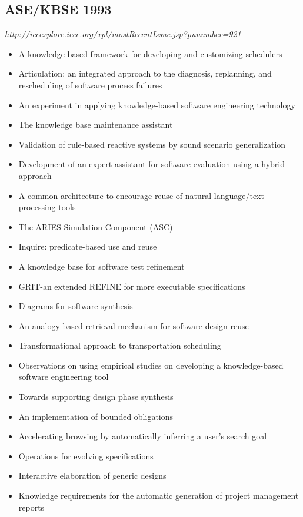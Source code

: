 \subsection{ASE/KBSE 1993}

{\small \em http://ieeexplore.ieee.org/xpl/mostRecentIssue.jsp?punumber=921}

{\small
\begin{itemize}[itemsep=-1ex]
  \item A knowledge based framework for developing and customizing schedulers
  \item Articulation: an integrated approach to the diagnosis, replanning, and rescheduling of software process failures
  \item An experiment in applying knowledge-based software engineering technology
  \item The knowledge base maintenance assistant
  \item Validation of rule-based reactive systems by sound scenario generalization
  \item Development of an expert assistant for software evaluation using a hybrid approach
  \item A common architecture to encourage reuse of natural language/text processing tools
  \item The ARIES Simulation Component (ASC)
  \item Inquire: predicate-based use and reuse
  \item A knowledge base for software test refinement
  \item GRIT-an extended REFINE for more executable specifications
  \item Diagrams for software synthesis
  \item An analogy-based retrieval mechanism for software design reuse
  \item Transformational approach to transportation scheduling
  \item Observations on using empirical studies on developing a knowledge-based software engineering tool
  \item Towards supporting design phase synthesis
  \item An implementation of bounded obligations
  \item Accelerating browsing by automatically inferring a user's search goal
  \item Operations for evolving specifications
  \item Interactive elaboration of generic designs
  \item Knowledge requirements for the automatic generation of project management reports
\end{itemize}
}

